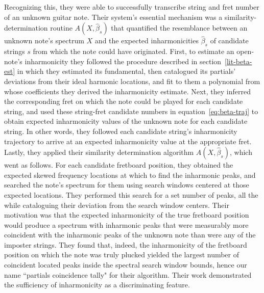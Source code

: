 \documentclass[12pt]{cmuthesis}
\begin{document}
Recognizing this, they were able to successfully transcribe string and fret number of an unknown guitar note. Their system's essential mechanism was a similarity-determination routine $A(X,\hat{\beta}_s)$ that quantified the resemblance between an unknown note's spectrum $X$ and the expected inharmonicities $\hat\beta_s$ of candidate strings $s$ from which the note could have originated. First, to estimate an open-note's inharmonicity they followed the procedure described in section~\ref{lit-beta-est} in which they estimated its fundamental, then catalogued its partials' deviations from their ideal harmonic locations, and fit to them a polynomial from whose coefficients they derived the inharmonicity estimate. Next, they inferred the corresponding fret on which the note could be played for each candidate string, and used these string-fret candidate numbers in equation~\eqref{eq:beta-traj} to obtain expected inharmonicity values of the unknown note for each candidate string. In other words, they followed each candidate string's inharmonicity trajectory to arrive at an expected inharmonicity value at the appropriate fret. Lastly, they applied their similarity determination algorithm $A(X,\hat{\beta}_s)$, which went as follows. For each candidate fretboard position, they obtained the expected skewed frequency locations at which to find the inharmonic peaks, and searched the note's spectrum for them using search windows centered at those expected locations. They performed this search for a set number of peaks, all the while cataloguing their deviation from the search window centers. Their motivation was that the expected inharmonicity of the true fretboard position would produce a spectrum with inharmonic peaks that were measurably more coincident with the inharmonic peaks of the unknown note than were any of the imposter strings. They found that, indeed, the inharmonicity of the fretboard position on which the note was truly plucked yielded the largest number of coincident located peaks inside the spectral search window bounds, hence our name ``partials coincidence tally" for their algorithm. Their work demonstrated the sufficiency of inharmonicity as a discriminating feature.
\end{document}
